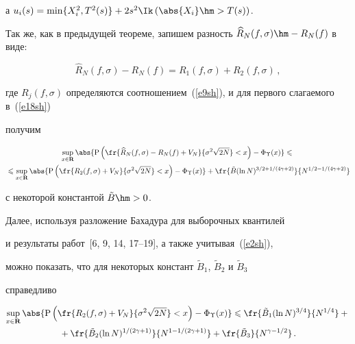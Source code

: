 а $u_i(s)=\min\{X_i^2,T^2(s)\}+ 2s^2\Ik\left(\abs{X_i}\hm>T(s)\right)$.



Так же, как в предыдущей теореме, запишем разность $\widehat{R}_N(f,\sigma)\hm-R_N(f)$ в виде:

$$

\widehat{R}_N(f,\sigma)-R_N(f)=R_1(f,\sigma)+R_2(f,\sigma)\,,

$$

где $R_j(f,\sigma)$ определяются соотношением~(\ref{e9sh}), и для первого слагаемого в~(\ref{e18sh}) 

получим

\begin{multline}

\sup\limits_{x\in\mathbf{R}}\abs{\mathrm{P}\left(

\fr{\widehat{R}_N(f,\sigma)-R_N(f)+V_N}{\sigma^2\sqrt{2N}}<x\right)-

\Phi_{\Upsilon}(x)}\leqslant{}\\

{}\leqslant\sup\limits_{x\in\mathbf{R}}\abs{\mathrm{P}\left(

\fr{R_2(f,\sigma)+V_N}{\sigma^2\sqrt{2N}}<x\right)-

\Phi_{\Upsilon}(x)}+\fr{\tilde{B}(\ln N)^{{3}/{2}+{1}/(4\gamma+2)}}

{N^{{1}/{2}-{1}/(4\gamma+2)}}\label{e19sh}

\end{multline}

с некоторой константой $\tilde{B}\hm>0$.



Далее, используя разложение Бахадура для выборочных квантилей~\cite{16sh} 

и результаты работ~[6, 9, 14, 17--19], а также учитывая~(\ref{e2sh}), 

можно показать, что для некоторых констант $\tilde{B}_1$, $\tilde{B}_2$ и $\tilde{B}_3$ 

справедливо

\begin{multline}

\sup\limits_{x\in\mathbf{R}}\abs{\mathrm{P}\left(

\fr{R_2(f,\sigma)+V_N}{\sigma^2\sqrt{2N}}<x\right)-

\Phi_{\Upsilon}(x)}\leqslant\fr{\tilde{B}_1(\ln N)^{3/4}}{N^{{1}/{4}}}+{}\\

{}+

\fr{\tilde{B}_2(\ln N)^{1/(2\gamma+1)}}{N^{1-{1}/(2\gamma+1)}}+

\fr{\tilde{B}_3}{N^{\gamma-{1}/{2}}}\,.\label{e20sh}

\end{multline}



